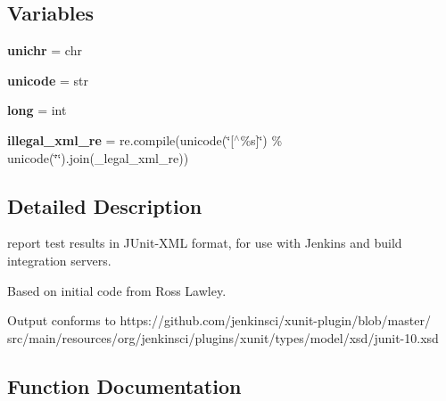 \subsection*{Variables}
\begin{DoxyCompactItemize}
\item 
\mbox{\label{namespace__pytest_1_1junitxml_a382190db8e657424f0ec3450064084b7}} 
{\bfseries unichr} = chr
\item 
\mbox{\label{namespace__pytest_1_1junitxml_ac616f7ed80014f2aa209e0c3d84c3239}} 
{\bfseries unicode} = str
\item 
\mbox{\label{namespace__pytest_1_1junitxml_a72e1641cfe24222403740be33201f0cc}} 
{\bfseries long} = int
\item 
\mbox{\label{namespace__pytest_1_1junitxml_a8104f76e94df64c5f167ae4b25dd08cb}} 
{\bfseries illegal\+\_\+xml\+\_\+re} = re.\+compile(unicode(\char`\"{}\mbox{[}$^\wedge$\%s\mbox{]}\char`\"{}) \% unicode(\char`\"{}\char`\"{}).join(\+\_\+legal\+\_\+xml\+\_\+re))
\end{DoxyCompactItemize}


\subsection{Detailed Description}
\begin{DoxyVerb}report test results in JUnit-XML format,
for use with Jenkins and build integration servers.


Based on initial code from Ross Lawley.

Output conforms to https://github.com/jenkinsci/xunit-plugin/blob/master/
src/main/resources/org/jenkinsci/plugins/xunit/types/model/xsd/junit-10.xsd
\end{DoxyVerb}
 

\subsection{Function Documentation}
\mbox{\label{namespace__pytest_1_1junitxml_ad331b67a9b40cbd4121576852a296315}} 
